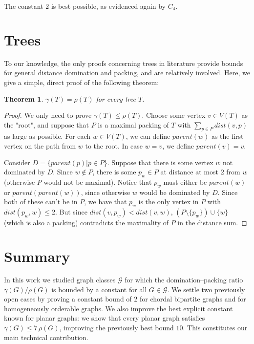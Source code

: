 \documentclass[a4paper, 12pt]{article}
\newtheorem{theorem}{Theorem}[section]
\begin{document}
The constant $2$ is best possible, as evidenced again by $C_4$.

\section{Trees}

To our knowledge, the only proofs concerning trees in literature provide bounds for general distance domination and packing, and are relatively involved.
Here, we give a simple, direct proof of the following theorem:

\begin{theorem}
    $\gamma(T) = \rho(T)$ for every tree $T$.
\end{theorem}

\begin{proof}
    We only need to prove $\gamma(T) \leq \rho(T)$. Choose some vertex $v \in V(T)$ as the "root", and suppose that $P$ is a maximal packing of $T$ with $ \sum_{p\in P} dist(v, p) $ as large as possible. For each $w \in V(T)$, we can define $parent(w)$ as the first vertex on the path from $w$ to the root. In case $w = v$, we define $parent(v) = v$.

    Consider $D = \{ parent(p) | p \in P \}$. Suppose that there is some vertex $w$ not dominated by $D$. Since $w \notin P$, there is some $p_w \in P$ at distance at most $2$ from $w$ (otherwise $P$ would not be maximal). Notice that $p_w$ must either be $parent(w)$ or $parent(parent(w))$, since otherwise $w$ would be dominated by $D$. Since both of these can't be in $P$, we have that $p_w$ is the only vertex in $P$ with $dist(p_w, w) \leq 2$. But since $dist(v,p_w) < dist(v, w)$, $(P\setminus\{p_w\}) \cup \{w\}$ (which is also a packing) contradicts the maximality of $P$ in the distance sum.
\end{proof}

\section{Summary}
In this work we studied graph classes $\mathcal G$ for which the domination--packing ratio $\gamma(G)/\rho(G)$ is bounded by a constant for all $G\in\mathcal G$.
We settle two previously open cases by proving a constant bound of $2$ for chordal bipartite graphs and for homogeneously orderable graphs.
We also improve the best explicit constant known for planar graphs: we show that every planar graph satisfies $\gamma(G)\le 7\,\rho(G)$, improving the previously best bound $10$. This constitutes our main technical contribution.
\end{document}
